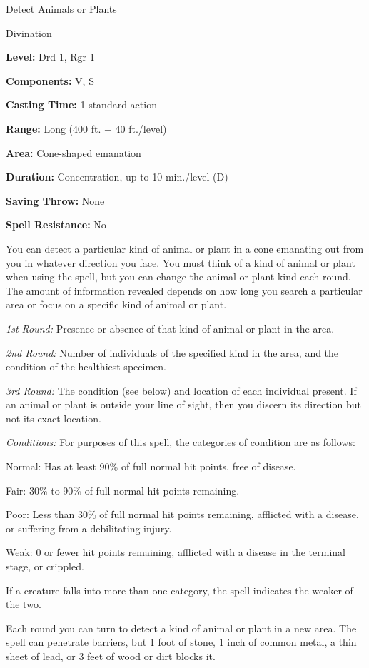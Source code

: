 \documentclass{article}
\begin{document}
\vspace{12pt}
Detect Animals or Plants

Divination

\textbf{Level:} Drd 1, Rgr 1

\textbf{Components:} V, S

\textbf{Casting Time:} 1 standard action

\textbf{Range:} Long (400 ft. + 40 ft./level)

\textbf{Area:} Cone-shaped emanation

\textbf{Duration:} Concentration, up to 10 min./level (D)

\textbf{Saving Throw:} None

\textbf{Spell Resistance:} No

You can detect a particular kind of animal or plant in a cone emanating out from 
you in whatever direction you face. You must think of a kind of animal or plant 
when using the spell, but you can change the animal or plant kind each round. The 
amount of information revealed depends on how long you search a particular area 
or focus on a specific kind of animal or plant.

\textit{1st Round: }Presence or absence of that kind of animal or plant in the 
area.

\textit{2nd Round: }Number of individuals of the specified kind in the area, and 
the condition of the healthiest specimen.

\textit{3rd Round: }The condition (see below) and location of each individual present. 
If an animal or plant is outside your line of sight, then you discern its direction 
but not its exact location.

\textit{Conditions: }For purposes of this spell, the categories of condition are 
as follows:

Normal: Has at least 90\% of full normal hit points, free of disease.

Fair: 30\% to 90\% of full normal hit points remaining.

Poor: Less than 30\% of full normal hit points remaining, afflicted with a disease, 
or suffering from a debilitating injury.

Weak: 0 or fewer hit points remaining, afflicted with a disease in the terminal 
stage, or crippled.

If a creature falls into more than one category, the spell indicates the weaker 
of the two.

Each round you can turn to detect a kind of animal or plant in a new area. The 
spell can penetrate barriers, but 1 foot of stone, 1 inch of common metal, a thin 
sheet of lead, or 3 feet of wood or dirt blocks it.
\end{document}
